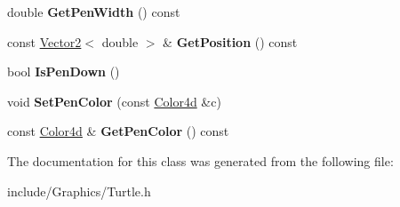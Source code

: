 \begin{DoxyCompactItemize}
\mbox{\label{classastu_1_1Turtle_ad0f29e2ceff9b6683dfc8720f6ae62b1}} 
double {\bfseries Get\+Pen\+Width} () const
\item 
\mbox{\label{classastu_1_1Turtle_a5a3f2d1869875670248574888f05527b}} 
const \hyperlink{classastu_1_1Vector2}{Vector2}$<$ double $>$ \& {\bfseries Get\+Position} () const
\item 
\mbox{\label{classastu_1_1Turtle_a6f082c628988ef9b7586bd8849c4d379}} 
bool {\bfseries Is\+Pen\+Down} ()
\item 
\mbox{\label{classastu_1_1Turtle_ab8a82e752a3b92f26641f4f8b8e5ff1c}} 
void {\bfseries Set\+Pen\+Color} (const \hyperlink{classastu_1_1Color}{Color4d} \&c)
\item 
\mbox{\label{classastu_1_1Turtle_a056aa916a2f9ecb720f81c4e9d13f1f0}} 
const \hyperlink{classastu_1_1Color}{Color4d} \& {\bfseries Get\+Pen\+Color} () const
\end{DoxyCompactItemize}


The documentation for this class was generated from the following file\+:\begin{DoxyCompactItemize}
\item 
include/\+Graphics/Turtle.\+h\end{DoxyCompactItemize}
